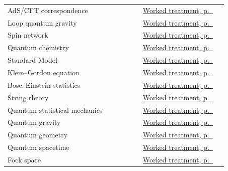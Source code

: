 \documentclass[11pt,oneside]{book}
\begin{document}
\begin{longtable}{p{0.57\linewidth}p{0.35\linewidth}}
\label{index:ads-cft-correspondence}AdS/CFT correspondence & \hyperref[topic:ads-cft-correspondence]{Worked treatment, p.~\pageref*{topic:ads-cft-correspondence}} \\
\label{index:loop-quantum-gravity}Loop quantum gravity & \hyperref[topic:loop-quantum-gravity]{Worked treatment, p.~\pageref*{topic:loop-quantum-gravity}} \\
\label{index:spin-network}Spin network & \hyperref[topic:spin-network]{Worked treatment, p.~\pageref*{topic:spin-network}} \\
\label{index:quantum-chemistry}Quantum chemistry & \hyperref[topic:quantum-chemistry]{Worked treatment, p.~\pageref*{topic:quantum-chemistry}} \\
\label{index:standard-model}Standard Model & \hyperref[topic:standard-model]{Worked treatment, p.~\pageref*{topic:standard-model}} \\
\label{index:klein-gordon-equation}Klein–Gordon equation & \hyperref[topic:klein-gordon-equation]{Worked treatment, p.~\pageref*{topic:klein-gordon-equation}} \\
\label{index:bose-einstein-statistics}Bose–Einstein statistics & \hyperref[topic:bose-einstein-statistics]{Worked treatment, p.~\pageref*{topic:bose-einstein-statistics}} \\
\label{index:string-theory}String theory & \hyperref[topic:string-theory]{Worked treatment, p.~\pageref*{topic:string-theory}} \\
\label{index:quantum-statistical-mechanics}Quantum statistical mechanics & \hyperref[topic:quantum-statistical-mechanics]{Worked treatment, p.~\pageref*{topic:quantum-statistical-mechanics}} \\
\label{index:quantum-gravity}Quantum gravity & \hyperref[topic:quantum-gravity]{Worked treatment, p.~\pageref*{topic:quantum-gravity}} \\
\label{index:quantum-geometry}Quantum geometry & \hyperref[topic:quantum-geometry]{Worked treatment, p.~\pageref*{topic:quantum-geometry}} \\
\label{index:quantum-spacetime}Quantum spacetime & \hyperref[topic:quantum-spacetime]{Worked treatment, p.~\pageref*{topic:quantum-spacetime}} \\
\label{index:fock-space}Fock space & \hyperref[topic:fock-space]{Worked treatment, p.~\pageref*{topic:fock-space}} \\
\bottomrule
\end{longtable}
\end{document}
